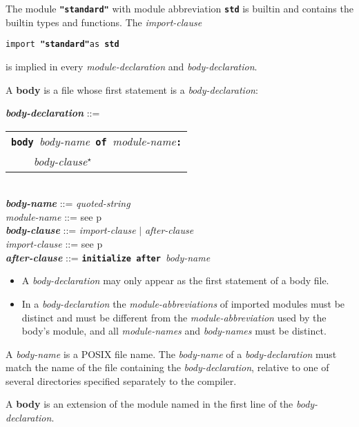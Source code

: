 \documentclass[12pt]{article}
\newcommand{\TT}[1]{{\tt \bfseries #1}}
\newcommand{\STAR}{{\Large $^\star$}}
\newcommand{\key}[1]{{\rm \bfseries #1}}
\newcommand{\ttkey}[1]{{\tt \bfseries #1}}
\newcommand{\emkey}[1]{{\em \bfseries #1}}
\newcommand{\pagref}[1]{p\pageref{#1}}
\newenvironment{indpar}[1][0.3in]%
	{\begin{list}{}%
		     {\setlength{\itemsep}{0in}%
		      \setlength{\topsep}{0in}%
		      \setlength{\parsep}{1ex}%
		      \setlength{\labelwidth}{#1}%
		      \setlength{\leftmargin}{#1}%
		      \addtolength{\leftmargin}{\labelsep}}%
	 \item}%
	{\end{list}}
\begin{document}
The module \TT{"standard"}\index{standard@\TT{"standard"}} with
module abbreviation \ttkey{std} is builtin and contains the builtin types and
functions.  The {\em import-clause}
\begin{center}
{\tt import }\TT{"standard"}{\tt as \ttkey{std}}
\end{center}
is implied in every {\em module-declaration} and
{\em body-declaration}.

A \key{body} is a file whose first statement is a {\em body-declaration}:

\begin{indpar}
\emkey{body-declaration}\label{BODY-DECLARATION} ::=
    \begin{tabular}[t]{l}
    \TT{body }{\em body-name}\TT{ of }{\em module-name}\TT{:} \\
    \TT{~~~~}{\em body-clause}\STAR{} \\
    \end{tabular}
\\[0.5ex]
\emkey{body-name} ::= {\em quoted-string}
\\[0.5ex]
{\em module-name} ::= see \pagref{MODULE-NAME}
\\[0.5ex]
\emkey{body-clause} ::= {\em import-clause} $|$ {\em after-clause}
\\[0.5ex]
{\em import-clause} ::= see \pagref{IMPORT-CLAUSE}
\\[0.5ex]
\emkey{after-clause} ::= \ttkey{initialize after }{\em body-name}

\begin{itemize}

\item
A {\em body-declaration} may only appear as the first statement
of a body file.

\item
In a {\em body-declaration} the {\em module-abbreviations} of imported
modules must be distinct and must be different from the
{\em module-abbreviation} used by the body's module,
and all {\em module-names} and {\em body-names} must be distinct.
\end{itemize}

\end{indpar}

A {\em body-name} is a POSIX file name.
The {\em body-name} of a {\em body-declaration} must match the
name of the file containing the
{\em body-declaration}, relative to one of several directories
specified separately to the compiler.

A \key{body} is an extension of the module named in the first
line of the {\em body-declaration}.
\end{document}
